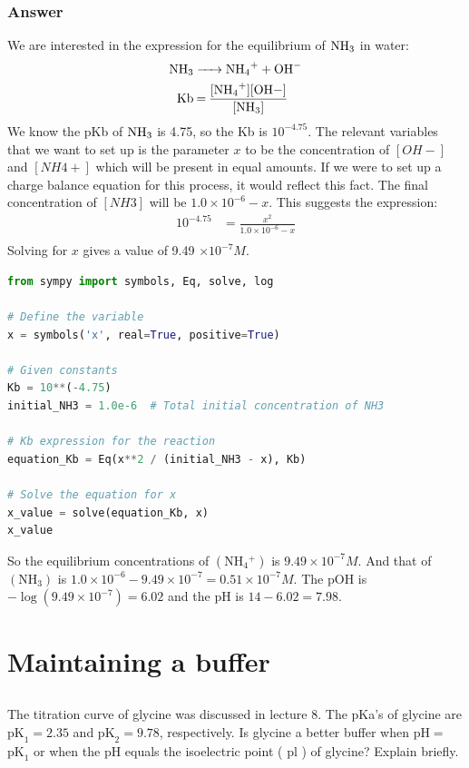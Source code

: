 \documentclass[12pt]{article}
\begin{document}
\subsubsection{Answer}
We are interested in the expression for the equilibrium of $\ce{NH3}$ in water:
\begin{align*}
  \ce{NH3 &-> NH4+ + OH-} \\
  \ce{Kb & = \frac{[NH4+][OH-]}{[NH3]}} \\
\end{align*}
We know the pKb of $\ce{NH3}$ is 4.75, so the Kb is $10^{-4.75}$. The relevant variables that we want to set up is the parameter $x$ to be the concentration of $[OH-]$ and $[NH4+]$ which will be present in equal amounts. If we were to set up a charge balance equation for this process, it would reflect this fact. The final concentration of $[NH3]$ will be $1.0 \times 10^{-6} - x$. This suggests the expression:
\begin{align*}
  10^{-4.75} & = \frac{x^2}{1.0 \times 10^{-6} - x} \\
\end{align*}
Solving for $x$ gives a value of 9.49 $\times 10^{-7} M$.
\begin{lstlisting}[language=Python]
from sympy import symbols, Eq, solve, log

# Define the variable
x = symbols('x', real=True, positive=True)

# Given constants
Kb = 10**(-4.75)
initial_NH3 = 1.0e-6  # Total initial concentration of NH3

# Kb expression for the reaction
equation_Kb = Eq(x**2 / (initial_NH3 - x), Kb)

# Solve the equation for x
x_value = solve(equation_Kb, x)
x_value
\end{lstlisting}
So the equilibrium concentrations of $\left(\mathrm{NH}_{4}{ }^{+}\right)$ is $9.49 \times 10^{-7} M$. And that of $\left(\mathrm{NH}_{3}\right)$ is $1.0 \times 10^{-6} - 9.49 \times 10^{-7} = 0.51 \times 10^{-7} M$. The $\mathrm{pOH}$ is $-\log(9.49 \times 10^{-7}) = 6.02$ and the $\mathrm{pH}$ is $14 - 6.02 = 7.98$.






\section{Maintaining a buffer}
\subsection{}
The titration curve of glycine was discussed in lecture 8. The pKa's of glycine are $\mathrm{pK}_{1}=2.35$ and $\mathrm{pK}_{2}=9.78$, respectively. Is glycine a better buffer when $\mathrm{pH}=$ $\mathrm{pK}_{1}$ or when the $\mathrm{pH}$ equals the isoelectric point ( $\mathrm{pl}$ ) of glycine? Explain briefly.
\end{document}
